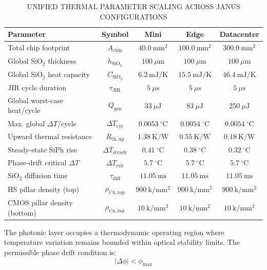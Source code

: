 \documentclass[journal]{IEEEtran}
\begin{document}
\begin{table}[htbp]
\centering
\small
\setlength{\tabcolsep}{5pt}
\caption{UNIFIED THERMAL PARAMETER SCALING ACROSS JANUS CONFIGURATIONS}
\label{tab:table11}
\begin{tabular}{lcccc}
\toprule
Parameter & Symbol & Mini & Edge & Datacenter \\
\midrule
Total chip footprint & $A_{\mathrm{chip}}$ & $40.0~\mathrm{mm^2}$ & $100.0~\mathrm{mm^2}$ & $300.0~\mathrm{mm^2}$ \\
Global SiO$_2$ thickness & $h_{\mathrm{SiO_2}}$ & $100~\mu\mathrm{m}$ & $100~\mu\mathrm{m}$ & $100~\mu\mathrm{m}$ \\
Global SiO$_2$ heat capacity & $C_{\mathrm{SiO_2}}$ & $6.2~\mathrm{mJ/K}$ & $15.5~\mathrm{mJ/K}$ & $46.4~\mathrm{mJ/K}$ \\
JIR cycle duration & $\tau_{\mathrm{JIR}}$ & $5~\mu\mathrm{s}$ & $5~\mu\mathrm{s}$ & $5~\mu\mathrm{s}$ \\
Global worst-case heat/cycle & $Q_{\mathrm{gen}}$ & $33~\mu\mathrm{J}$ & $83~\mu\mathrm{J}$ & $250~\mu\mathrm{J}$ \\
Max. global $\Delta T$/cycle & $\Delta T_{\mathrm{cyc}}$ & $0.0053~^\circ\mathrm{C}$ & $0.0054~^\circ\mathrm{C}$ & $0.0054~^\circ\mathrm{C}$ \\
Upward thermal resistance & $R_{\mathrm{th,up}}$ & $1.38~\mathrm{K/W}$ & $0.55~\mathrm{K/W}$ & $0.18~\mathrm{K/W}$ \\
Steady-state SiPh rise & $\Delta T_{\mathrm{steady}}$ & $0.41~^\circ\mathrm{C}$ & $0.38~^\circ\mathrm{C}$ & $0.32~^\circ\mathrm{C}$ \\
Phase-drift critical $\Delta T$ & $\Delta T_{\mathrm{crit}}$ & $5.7~^\circ\mathrm{C}$ & $5.7~^\circ\mathrm{C}$ & $5.7~^\circ\mathrm{C}$ \\
SiO$_2$ diffusion time & $\tau_{\mathrm{diff}}$ & $11.05~\mathrm{ms}$ & $11.05~\mathrm{ms}$ & $11.05~\mathrm{ms}$ \\
HS pillar density (top) & $\rho_{\mathrm{Cu,top}}$ & $900~\mathrm{k/mm^2}$ & $900~\mathrm{k/mm^2}$ & $900~\mathrm{k/mm^2}$ \\
CMOS pillar density (bottom) & $\rho_{\mathrm{Cu,bot}}$ & $10~\mathrm{k/mm^2}$ & $10~\mathrm{k/mm^2}$ & $10~\mathrm{k/mm^2}$ \\
\bottomrule
\end{tabular}
\end{table}

The photonic layer occupies a thermodynamic operating region where temperature variation remains bounded within optical stability limits.
The permissible phase drift condition is:
\begin{equation}
|\Delta \phi| < \phi_{\text{max}}
\end{equation}
\end{document}
